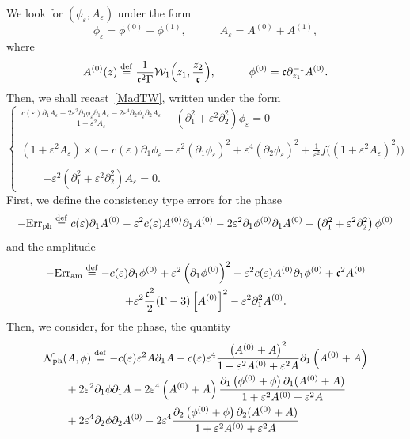 \documentclass[AHL,Unicode,longabstracts,published]{cedram}
\newcommand*\p{\partial}
\newcommand*\ddef{\stackrel{\rm def}{=}}
\newcommand{\amm}{\mathrm{am}}
\newcommand{\phl}{\mathrm{ph}}
\newcommand{\Err}{\mathrm{Err}}
\newcommand*\BN{\mathcal{N}}
\newcommand*\BW{\mathcal{W}}
\newcommand*\ds{\displaystyle}
\newcommand*\cs{{\mathfrak c}}
\newcommand*\e{\varepsilon}
\newcommand*\G{\Gamma}
\begin{document}
We look for $ (\phi_\e, A_\e)$ under the form
\[
\phi_\e = \phi^{(0)} + \phi^{(1)},
\quad \quad \quad A_\e = A^{(0)} + A^{(1)},
\]
where
\begin{equation}\label{choixA-phi}
A^{(0)} (z) \ddef \frac{1}{\cs^2 \G} \BW_1 \Big(z_1, \frac{z_2}{\cs} \Big),
\quad \quad \quad \phi^{(0)} = \cs \p_{z_1}^{-1} A^{(0)}.
\end{equation} Then, we shall recast~\eqref{MadTW}, written under the form
\begin{equation*}
\left\{
\begin{array}{ll}
\ds{
\frac{ c(\e) \p_{1} A_\e - 2 \e^2 \p_{1} \phi_\e \p_{1} A_\e - 2 \e^4 \p_{2} \phi_\e \p_{2} A_\e }{ 1 + \e^2 A_\e } - \left(\p_{1}^2 + \e^2 \p^2_{2}\right) \phi_\e } = 0 \\ \ \\
\ds{ \left(1+\e^2 A_\e\right) \times \Big(- c(\e) \p_{1} \phi_\e + \e^2 (\p_{1} \phi_\e)^2 + \e^4 (\p_{2} \phi_\e)^2 + \frac{1}{\e^2} f \big(\left(1 +\e^2 A_\e\right)^2 \big) \Big)}
\\ \ \\ \qquad \ds{ - \e^2 \left(\p_{1}^2 + \e^2 \p_{2}^2\right) A_\e = 0}.
\end{array}\right.
\end{equation*}
First, we define the consistency type errors for the phase
\[
- \Err_{\phl}
\ddef c(\e) \p_{1} A^{(0)} - \e^2 c (\e) A^{(0)} \p_{1} A^{(0)} - 2 \e^2 \p_{1} \phi^{(0)} \p_{1} A^{(0)} - \left(\p_{1}^2 + \e^2 \p^2_{2}\right) \phi^{(0)}
\]
and the amplitude
\begin{multline*}
- \Err_{\amm} \ddef - c(\e) \p_{1} \phi^{(0)} + \e^2 \left(\p_{1} \phi^{(0)}\right)^2 - \e^2 c(\e) A^{(0)} \p_{1} \phi^{(0)} + \cs^2 A^{(0)}
\\+ \e^2 \frac{\cs^2}{2} (\Gamma -3) \left[A^{(0)}\right]^2 - \e^2 \p_{1}^2 A^{(0)}.
\end{multline*}
Then, we consider, for the phase, the quantity
\begin{multline}\label{def:sourceA}
\BN_{\phl} (A, \phi) \ddef - c(\e) \e^2 A \p_1 A - c(\e) \e^4 \frac{ \left(A^{(0)} + A\right)^2 }{ 1 + \e^2 A^{(0)} + \e^2 A } \p_{1} \left(A^{(0)} + A\right)
\\
\begin{aligned}
& + 2 \e^2 \p_1 \phi \p_1 A - 2 \e^4 \left(A^{(0)} + A\right) \frac{ \p_{1} \left(\phi^{(0)} + \phi\right) \p_{1} (A^{(0)} + A) }{ 1 + \e^2 A^{(0)} + \e^2 A }
\\ & + 2 \e^4 \p_2 \phi \p_2 A^{(0)} - 2 \e^4 \frac{ \p_{2} \left(\phi^{(0)} + \phi\right) \p_{2} (A^{(0)} + A) }{ 1 + \e^2 A^{(0)} + \e^2 A }
\end{aligned}
\end{multline}
\end{document}
